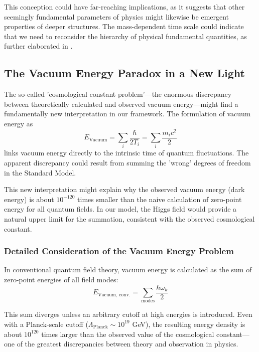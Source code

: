\documentclass[a4paper,12pt]{article}
\begin{document}
	This conception could have far-reaching implications, as it suggests that other seemingly fundamental parameters of physics might likewise be emergent properties of deeper structures. The mass-dependent time scale could indicate that we need to reconsider the hierarchy of physical fundamental quantities, as further elaborated in \cite{pascher_kompl_2025}.
	
	\subsection{The Vacuum Energy Paradox in a New Light}
	
	The so-called 'cosmological constant problem'—the enormous discrepancy between theoretically calculated and observed vacuum energy—might find a fundamentally new interpretation in our framework. The formulation of vacuum energy as 
	\begin{equation}
		E_{\text{Vacuum}} = \sum_i \frac{\hbar}{2T_i} = \sum_i \frac{m_i c^2}{2}
	\end{equation}
	links vacuum energy directly to the intrinsic time of quantum fluctuations. The apparent discrepancy could result from summing the 'wrong' degrees of freedom in the Standard Model.
	
	This new interpretation might explain why the observed vacuum energy (dark energy) is about $10^{-120}$ times smaller than the naive calculation of zero-point energy for all quantum fields. In our model, the Higgs field would provide a natural upper limit for the summation, consistent with the observed cosmological constant.
	
	\subsubsection{Detailed Consideration of the Vacuum Energy Problem}
	
	In conventional quantum field theory, vacuum energy is calculated as the sum of zero-point energies of all field modes:
	\begin{equation}
		E_{\text{Vacuum, conv.}} = \sum_{\text{modes}} \frac{\hbar\omega_k}{2}
	\end{equation}
	
	This sum diverges unless an arbitrary cutoff at high energies is introduced. Even with a Planck-scale cutoff ($\Lambda_{\text{Planck}} \sim 10^{19}$ GeV), the resulting energy density is about $10^{120}$ times larger than the observed value of the cosmological constant—one of the greatest discrepancies between theory and observation in physics.
	
\end{document}
